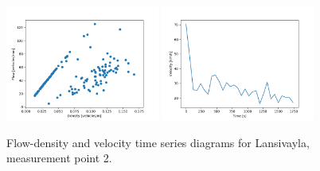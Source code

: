 \documentclass[english, 12pt, a4paper, elec, utf8, pdfa, online]{aaltothesis}
\begin{document}
\begin{figure}[ht!]
    \centering
    \includegraphics[width=0.45\textwidth]{graphs/Lansivayla_2_flw_dns.png}
    \includegraphics[width=0.45\textwidth]{graphs/Lansivayla_2_spd_time_6.png}
    \caption{Flow-density and velocity time series diagrams for Lansivayla, measurement point 2.}
\end{figure}
\end{document}
